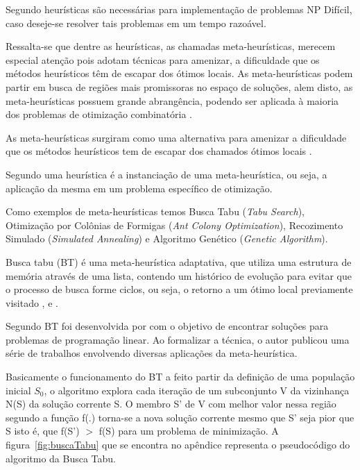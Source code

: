 \documentclass{abntpuc}
\begin{document}
Segundo \cite{evans1992optimization} heurísticas são necessárias para implementação de problemas NP Difícil, caso deseje-se resolver tais problemas em um tempo  razoável.\par

Ressalta-se que dentre as heurísticas, as chamadas meta-heurísticas, merecem especial atenção pois adotam técnicas para amenizar, a dificuldade que os métodos heurísticos têm de escapar dos ótimos locais. As meta-heurísticas podem partir em busca de regiões mais promissoras no espaço de soluções, alem disto, as meta-heurísticas possuem grande abrangência, podendo ser aplicada à maioria dos problemas de otimização combinatória \cite{nascimento2005aplicaccao}.\par

As meta-heurísticas surgiram como uma alternativa para amenizar a dificuldade que os métodos heurísticos tem de escapar dos chamados ótimos locais \cite{nascimento2005aplicaccao}.

Segundo \cite{adrianocesar} uma heurística é a instanciação de uma meta-heurística, ou seja, a aplicação da mesma em um problema específico de otimização.\par

Como exemplos de meta-heurísticas temos Busca Tabu (\textit{Tabu Search}), Otimização por Colônias de Formigas (\textit{Ant Colony Optimization}), Recozimento Simulado (\textit{Simulated Annealing}) e Algoritmo Genético (\textit{Genetic Algorithm}).\par


Busca tabu (BT) é uma meta-heurística adaptativa, que utiliza uma estrutura de memória através de uma lista, contendo um histórico de evolução para evitar que o processo de busca forme ciclos, ou seja, o retorno a um ótimo local previamente visitado \cite{souza2000} , \cite{armentanointroduccao} e \cite{subramanian2006aplicaccao}.\par


Segundo \cite{subramanian2006aplicaccao} BT foi desenvolvida por \cite{glover1986future} com o objetivo de encontrar soluções para problemas de programação linear. Ao formalizar a técnica, o autor publicou uma série de trabalhos envolvendo diversas aplicações da meta-heurística. \par

Basicamente o funcionamento do BT a feito partir da definição de uma população inicial ${S_0}$, o algoritmo explora cada iteração de um subconjunto V da vizinhança N(S) da solução corrente S. O membro S’ de V com melhor valor nessa região segundo a função f(.) torna-se a nova solução corrente mesmo que S’ seja pior que S isto é, que f(S’) $>$ f(S) para um problema de minimização\cite{souza2000}. A figura~\ref{fig:buscaTabu} que se encontra no apêndice representa o pseudocódigo do algoritmo da Busca Tabu.
\end{document}
